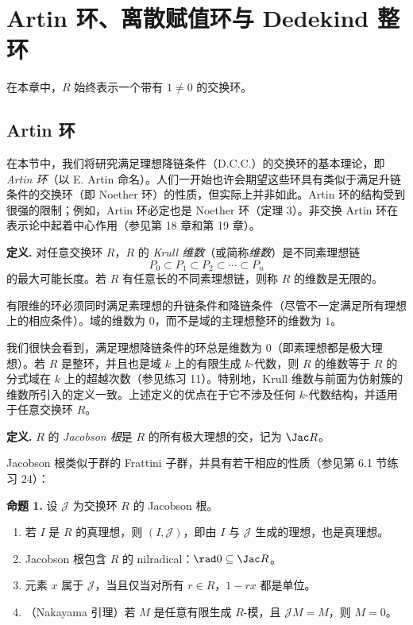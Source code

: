
\chapter{Artin 环、离散赋值环与 Dedekind 整环}

在本章中，$R$ 始终表示一个带有 $1\neq0$ 的交换环。

\section{Artin 环}

在本节中，我们将研究满足理想降链条件（D.C.C.）的交换环的基本理论，即 \emph{Artin 环}（以 E. Artin 命名）。人们一开始也许会期望这些环具有类似于满足升链条件的交换环（即 Noether 环）的性质，但实际上并非如此。Artin 环的结构受到很强的限制；例如，Artin 环必定也是 Noether 环（定理 3）。非交换 Artin 环在表示论中起着中心作用（参见第 18 章和第 19 章）。

\noindent\textbf{定义.} 对任意交换环 $R$，$R$ 的 \emph{Krull 维数}（或简称\emph{维数}）是不同素理想链
\[
  P_0\subset P_1\subset P_2\subset\cdots\subset P_n
\]
的最大可能长度。若 $R$ 有任意长的不同素理想链，则称 $R$ 的维数是无限的。

有限维的环必须同时满足素理想的升链条件和降链条件（尽管不一定满足所有理想上的相应条件）。域的维数为 $0$，而不是域的主理想整环的维数为 $1$。

我们很快会看到，满足理想降链条件的环总是维数为 $0$（即素理想都是极大理想）。若 $R$ 是整环，并且也是域 $k$ 上的有限生成 $k$-代数，则 $R$ 的维数等于 $R$ 的分式域在 $k$ 上的超越次数（参见练习 11）。特别地，Krull 维数与前面为仿射簇的维数所引入的定义一致。上述定义的优点在于它不涉及任何 $k$-代数结构，并适用于任意交换环 $R$。

\noindent\textbf{定义.} $R$ 的 \emph{Jacobson 根}是 $R$ 的所有极大理想的交，记为 $\Jac R$。

Jacobson 根类似于群的 Frattini 子群，并具有若干相应的性质（参见第 6.1 节练习 24）：

\medskip
\noindent\textbf{命题 1.} 设 $\mathcal J$ 为交换环 $R$ 的 Jacobson 根。
\begin{enumerate}[label=(\arabic*)]
  \item 若 $I$ 是 $R$ 的真理想，则 $(I,\mathcal J)$，即由 $I$ 与 $\mathcal J$ 生成的理想，也是真理想。
  \item Jacobson 根包含 $R$ 的 nilradical：$\rad 0\subseteq\Jac R$。
  \item 元素 $x$ 属于 $\mathcal J$，当且仅当对所有 $r\in R$，$1-rx$ 都是单位。
  \item （Nakayama 引理）若 $M$ 是任意有限生成 $R$-模，且 $\mathcal JM=M$，则 $M=0$。
\end{enumerate}

